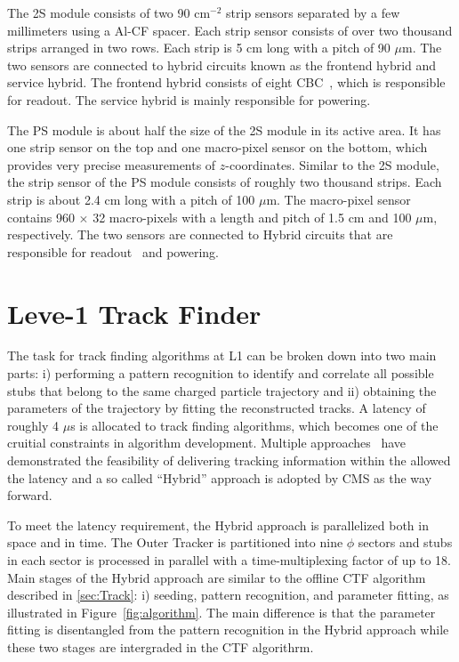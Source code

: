 The 2S module consists of two 90 cm$^{-2}$ strip sensors separated by a few millimeters using a \ac{Al-CF} spacer. Each strip sensor consists of over two thousand strips arranged in two rows. Each strip is 5 cm long with a pitch of 90 $\mu$m. The two sensors are connected to hybrid circuits known as the frontend hybrid and service hybrid. The frontend hybrid consists of eight \ac{CBC}~\cite{Raymond:2012zz}, which is responsible for readout. The service hybrid is mainly responsible for powering.

The PS module is about half the size of the 2S module in its active area. It has one strip sensor on the top and one macro-pixel sensor on the bottom, which provides very precise measurements of $z$-coordinates. Similar to the 2S module, the strip sensor of the PS module consists of roughly two thousand strips. Each strip is about 2.4 cm long with a pitch of 100 $\mu$m. The macro-pixel sensor contains 960 $\times$ 32 macro-pixels with a length and pitch of 1.5 cm and 100 $\mu$m, respectively. The two sensors are connected to Hybrid circuits that are responsible for readout~\cite{Ceresa:2016mqm} and powering.

\section{Leve-1 Track Finder}
\label{sec:Algo}

The task for track finding algorithms at \ac{L1} can be broken down into two main parts: i) performing a pattern recognition to identify and correlate all possible stubs that belong to the same charged particle trajectory and ii) obtaining the parameters of the trajectory by fitting the reconstructed tracks. A latency of roughly 4 $\mu$s is allocated to track finding algorithms, which becomes one of the cruitial constraints in algorithm development. Multiple approaches~\cite{CMS:2017lum} have demonstrated the feasibility of delivering tracking information within the allowed the latency and a so called ``Hybrid'' approach is adopted by \ac{CMS} as the way forward.

To meet the latency requirement, the Hybrid approach is parallelized both in space and in time. The Outer Tracker is partitioned into nine $\phi$ sectors and stubs in each sector is processed in parallel with a time-multiplexing factor of up to 18. Main stages of the Hybrid approach are similar to the offline \ac{CTF} algorithm described in \autoref{sec:Track}: i) seeding, pattern recognition, and parameter fitting, as illustrated in Figure~\ref{fig:algorithm}. The main difference is that the parameter fitting is disentangled from the pattern recognition in the Hybrid approach while these two stages are intergraded in the \ac{CTF} algorithrm.

